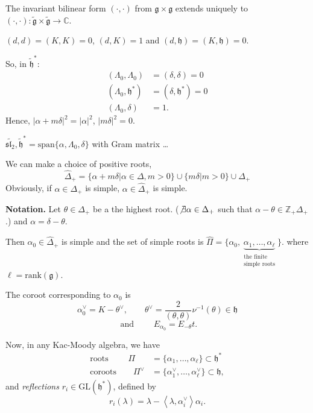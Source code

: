 \medskip\noindent
The invariant bilinear form $(\cdot,\cdot)$ from $\mathfrak{g} \times
\mathfrak{g}$ extends uniquely to
$(\cdot,\cdot):\tilde{\mathfrak{g}}\times\tilde{\mathfrak{g}}\to \mathbb{C}$.

$(d,d)=(K,K)=0$, $(d,K)=1$ and $(d,\mathfrak{h})=(K,\mathfrak{h})=0$.

\medskip\noindent
So, in $\tilde{\mathfrak{h}}^*$:
\begin{align*}
(\Lambda_0,\Lambda_0)&=(\delta,\delta)=0\\
(\Lambda_0,\mathfrak{h}^*)&=(\delta,\mathfrak{h}^*)=0\\
(\Lambda_0,\delta)&=1.
\end{align*}
Hence, $|\alpha+m \delta|^2=|\alpha|^2$, $|m \delta|^2=0$.

\begin{example}
\label{example-sl2hat}
$\widetilde{\mathfrak{sl}_2}, \tilde{\mathfrak{h}}^*
=\text{span}\{\alpha,\Lambda_0,\delta\}$ with Gram matrix …
\end{example}

We can make a choice of positive roots,
$$
\hat{\Delta}_+=\{\alpha+m \delta |\alpha \in \Delta, m>0\}
\cup \{m \delta|m>0\} \cup \Delta_+
$$
Obviously, if $\alpha \in \Delta_+$ is simple, 
$\alpha \in \hat{\Delta}_+$ is simple.

\medskip\noindent
{\bf Notation.} Let $\theta \in \Delta_+$ be a the highest root. ($\not \exists
\alpha \in \Delta_+$ such that $\alpha-\theta \in \mathbb{Z}_+ \Delta_+$.) and
 $\alpha=\delta-\theta$.

Then $\alpha_0 \in \hat{\Delta}_+$ is simple and the set of simple roots is
$\hat{\Pi}=\{\alpha_0,\underbrace{\alpha_1,\ldots,\alpha_\ell}
_{\substack{\text{the finite} \\ \text{simple roots}}} \}.$
where $\ell=\text{rank}(\mathfrak{g})$.

The coroot corresponding to $\alpha_0$ is 
$$
\alpha^\vee_0=K-\theta^\vee, \qquad
\theta^\vee=\frac{2}{(\theta,\theta)}\nu^{-1}(\theta) \in \mathfrak{h} 
$$
$$
\text{ and }\qquad E_{\alpha_0}=E_{-\theta}t.
$$

\medskip\noindent
Now, in any Kac-Moody algebra, we have
\begin{align*}
\text{roots }\qquad \Pi&=\{\alpha_1,\ldots,\alpha_\ell\}\subset\mathfrak{h}^* \\
\text{coroots}\qquad  \Pi^\vee&=\{\alpha_1^\vee,\ldots,\alpha_\ell^\vee\}\subset
\mathfrak{h},
\end{align*}
and {\it reflections} $r_i \in \text{GL}(\mathfrak{h}^*)$,
defined by 
$$
r_i(\lambda)=\lambda-\left<\lambda,\alpha_i^\vee\right>\alpha_i.
$$

